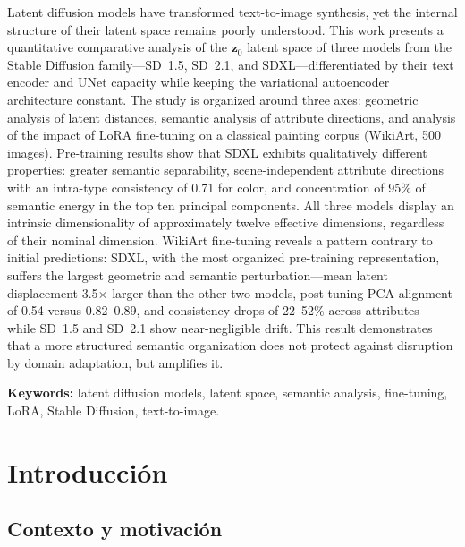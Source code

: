 \documentclass[12pt, a4paper, twoside]{book}
\newcommand{\z}{\mathbf{z}}
\begin{document}
Latent diffusion models have transformed text-to-image synthesis, yet the internal structure of their latent space remains poorly understood. This work presents a quantitative comparative analysis of the $\z_0$ latent space of three models from the Stable Diffusion family---SD~1.5, SD~2.1, and SDXL---differentiated by their text encoder and UNet capacity while keeping the variational autoencoder architecture constant. The study is organized around three axes: geometric analysis of latent distances, semantic analysis of attribute directions, and analysis of the impact of LoRA fine-tuning on a classical painting corpus (WikiArt, 500 images). Pre-training results show that SDXL exhibits qualitatively different properties: greater semantic separability, scene-independent attribute directions with an intra-type consistency of 0.71 for color, and concentration of 95\% of semantic energy in the top ten principal components. All three models display an intrinsic dimensionality of approximately twelve effective dimensions, regardless of their nominal dimension. WikiArt fine-tuning reveals a pattern contrary to initial predictions: SDXL, with the most organized pre-training representation, suffers the largest geometric and semantic perturbation---mean latent displacement 3.5$\times$ larger than the other two models, post-tuning PCA alignment of 0.54 versus 0.82--0.89, and consistency drops of 22--52\% across attributes---while SD~1.5 and SD~2.1 show near-negligible drift. This result demonstrates that a more structured semantic organization does not protect against disruption by domain adaptation, but amplifies it.

\bigskip
\noindent\textbf{Keywords:} latent diffusion models, latent space, semantic analysis, fine-tuning, LoRA, Stable Diffusion, text-to-image.

\tableofcontents
\listoftables
\listoffigures

\mainmatter

\chapter{Introducción}
\label{ch:intro}

\section{Contexto y motivación}
\label{sec:motivacion}
\end{document}

